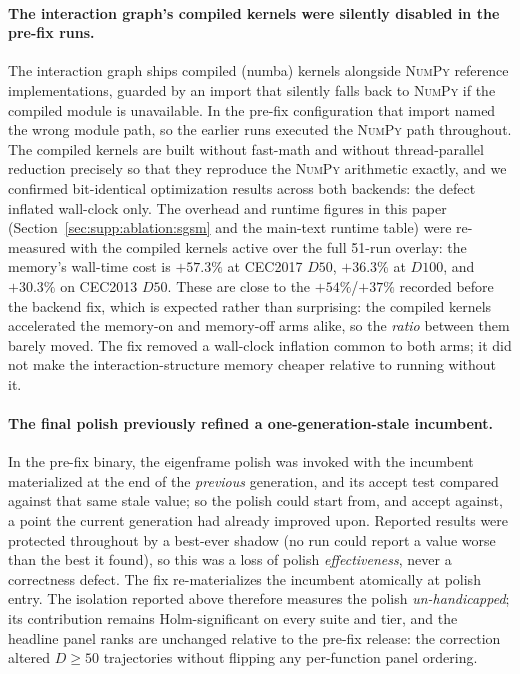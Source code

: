 \documentclass[algorithms,article,submit,moreauthors,pdftex]{Definitions/mdpi}
\begin{document}
\paragraph{The interaction graph's compiled kernels were silently disabled in the
pre-fix runs.}
The interaction graph ships compiled (numba) kernels alongside \textsc{NumPy}
reference implementations, guarded by an import that silently falls back to
\textsc{NumPy} if the compiled module is unavailable.  In the pre-fix configuration
that import named the wrong module path, so the earlier runs executed the
\textsc{NumPy} path throughout.  The compiled kernels are built without fast-math and
without thread-parallel reduction precisely so that they reproduce the \textsc{NumPy}
arithmetic exactly, and we confirmed bit-identical optimization results across both
backends: the defect inflated wall-clock only.  The overhead and runtime figures
in this paper (Section~\ref{sec:supp:ablation:sgsm} and the main-text runtime table)
were re-measured with the compiled kernels active over the full 51-run overlay:
the memory's wall-time cost is $+57.3\%$ at CEC2017 $D50$, $+36.3\%$ at $D100$,
and $+30.3\%$ on CEC2013 $D50$. These are close to the $+54\%$/$+37\%$ recorded
before the backend fix, which is expected rather than surprising: the compiled
kernels accelerated the memory-on and memory-off arms alike, so the \emph{ratio}
between them barely moved. The fix removed a wall-clock inflation common to both
arms; it did not make the interaction-structure memory cheaper relative to
running without it.

\paragraph{The final polish previously refined a one-generation-stale incumbent.}
In the pre-fix binary, the eigenframe polish was invoked with the incumbent
materialized at the end of the \emph{previous} generation, and its accept test
compared against that same stale value; so the polish could start from, and
accept against, a point the current generation had already improved upon.  Reported
results were protected throughout by a best-ever shadow (no run could report a value
worse than the best it found), so this was a loss of polish \emph{effectiveness},
never a correctness defect.  The fix re-materializes the incumbent atomically at
polish entry.  The isolation reported above therefore measures the polish
\emph{un-handicapped}; its contribution remains Holm-significant on every suite and
tier, and the headline panel ranks are unchanged relative to the pre-fix release:
the correction altered $D \geq 50$ trajectories without flipping any per-function
panel ordering.
\end{document}
